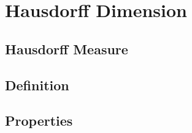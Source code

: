 
\chapter{Hausdorff Dimension}

\section{Hausdorff Measure}

\section{Definition}

\section{Properties}

